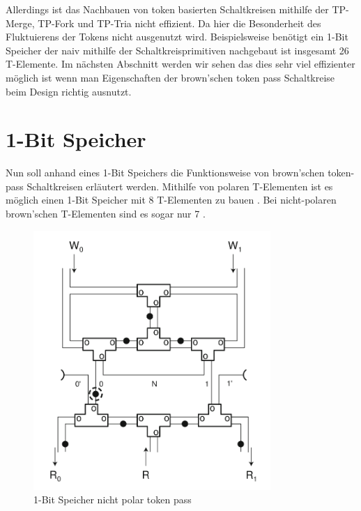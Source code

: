 \documentclass[11pt,a4paper]{article}
\begin{document}
%
Allerdings ist das Nachbauen von token basierten Schaltkreisen mithilfe
der TP-Merge, TP-Fork und TP-Tria nicht effizient.
%
Da hier die Besonderheit des Fluktuierens der Tokens nicht ausgenutzt wird.
%
Beispielsweise benötigt ein 1-Bit Speicher der naiv mithilfe der 
Schaltkreisprimitiven nachgebaut ist insgesamt 26 T-Elemente.
%
Im nächsten Abschnitt werden wir sehen das dies 
sehr viel effizienter möglich ist wenn man Eigenschaften der brown'schen 
token pass Schaltkreise beim Design richtig ausnutzt.



\section{1-Bit Speicher}
Nun soll anhand eines 1-Bit Speichers die Funktionsweise von brown'schen 
token-pass Schaltkreisen erläutert werden.
%
Mithilfe von polaren T-Elementen ist es möglich einen 1-Bit Speicher mit 8
T-Elementen zu bauen \cite{Peper_Fundamentals_2013}. 
%
Bei nicht-polaren brown'schen T-Elementen sind es sogar
nur 7 \cite{Peper_nonPolar_2018}.
%

\begin{figure}[h]
      \centering
      \includegraphics[width=9cm]{bilder/NonPolarMemory.png} 
      \caption{1-Bit Speicher nicht polar token pass}
\end{figure}

\end{document}

